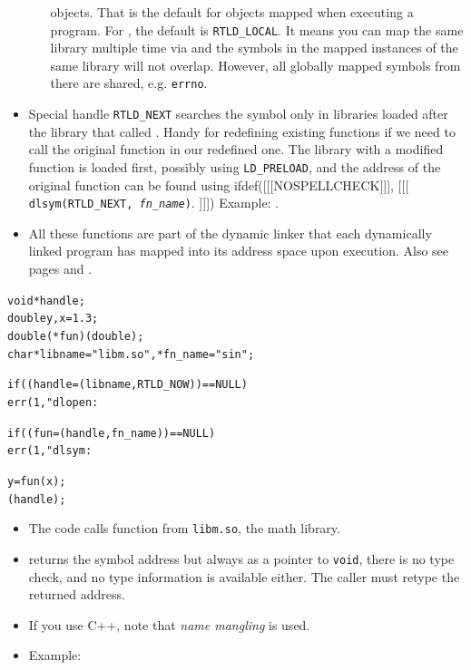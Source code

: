 \begin{itemize}
\begin{itemize}
    objects.  That is the default for objects mapped when executing a program.
    For , the default is \texttt{RTLD\_LOCAL}.  It means you can
    map the same library multiple time via  and the symbols in the
    mapped instances of the same library will not overlap.  However, all
    globally mapped symbols from there are shared, e.g. \texttt{errno}.
    \end{itemize}
\item \label{RTLD_NEXT} Special handle \texttt{RTLD\_NEXT} searches the symbol
only in libraries loaded after the library that called .  Handy for
redefining existing functions if we need to call the original function in our
redefined one.  The library with a modified function is loaded first, possibly
using \texttt{LD\_PRELOAD}, and the address of the original function can be
found using
ifdef([[[NOSPELLCHECK]]], [[[
\texttt{dlsym(RTLD\_NEXT, \emph{fn\_name})}.
]]])
Example: .
\item  All these functions are part of the dynamic linker that each dynamically
linked program has mapped into its address space upon execution.  Also see pages
\pageref{RUNTIMELINKER} and \pageref{EXEC}.
\end{itemize}


\begin{slide}
\begin{alltt}
void *handle;
double y, x = 1.3;
double (*fun)(double); 
char *libname = "libm.so", *fn\_name = "sin";

if ((handle = (libname, RTLD\_NOW)) == NULL)
        err(1, "dlopen: %

if ((fun = (handle, fn\_name)) == NULL)
        err(1, "dlsym: %

y = fun(x);
(handle);
\end{alltt}
\end{slide}

\begin{itemize}
\item The code calls function  from \texttt{libm.so}, the math
library.
\item {} returns the symbol address but always as a pointer to
\texttt{void}, there is no type check, and no type information is available
either.  The caller must retype the returned address.
\item If you use C++, note that \emph{name mangling} is used.
\item Example: 
\end{itemize}

\endinput
